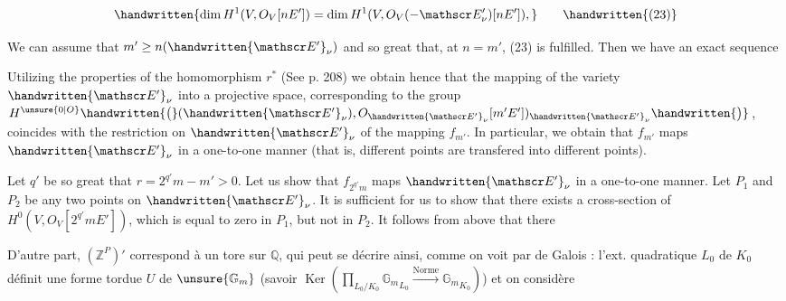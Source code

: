 \[
\handwritten{\dim H^1(V,O_V[nE'])=\dim H^1(V,O_V(-\mathscr E'_\nu)[nE']),}\tag*{\handwritten{(23)}}
\]

We can assume that $m'\geq n(\handwritten{\mathscr E'}_\nu)$ and so great that,
at $n=m'$, (23) is fulfilled. Then we have an exact
sequence


Utilizing the properties of the homomorphism
$r^*$ (See p. 208) we obtain hence that the mapping of the
variety $\handwritten{\mathscr E'}_\nu$ into a projective space, corresponding to
the group $H^{\unsure{0|O}}\handwritten{\big(}(\handwritten{\mathscr E'}_\nu),O_{\handwritten{\mathscr E'}_\nu}[m'E'])_{\handwritten{\mathscr E'}_\nu}\handwritten{\big)}$, coincides with the
restriction on $\handwritten{\mathscr E'}_\nu$ of the mapping $f_{m'}$. In particular,
we obtain that $f_{m'}$ maps $\handwritten{\mathscr E'}_\nu$ in a one-to-one manner
(that is, different points are transfered into different
points).

Let $q'$ be so great that $r=2^{q'}m-m'>0$. Let
us show that $f_{2^{q'}m}$ maps $\handwritten{\mathscr E'}_\nu$ in a one-to-one manner.
Let $P_1$ and $P_2$ be any two points on $\handwritten{\mathscr E'}_\nu$. It is
sufficient for us to show that there exists a cross-section of $H^0(V,O_V[2^{q'}mE'])$, which is equal to zero
in $P_1$, but not in $P_2$. It follows from above that there




D'autre part, $(\mathbb Z^P)'$ correspond à
un tore sur $\mathbb Q$, qui peut se décrire ainsi, comme
on voit par  de Galois : l'ext. quadratique
$L_0$ de $K_0$ définit une forme tordue
$U$ de $\unsure{\mathbb G_m}$ (savoir $\operatorname{Ker}\left(\prod_{L_0/K_0}{\mathbb G_m}_{L_0}\xrightarrow{\text{Norme}}{\mathbb G_m}_{K_0}\right)$)
et on considère 

